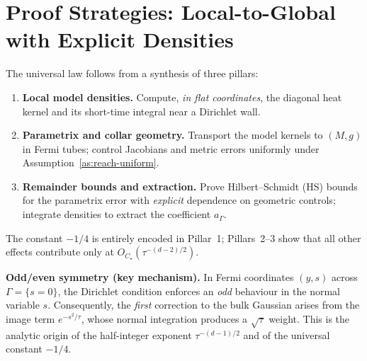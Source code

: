 
\section{Proof Strategies: Local-to-Global with Explicit Densities}
\label{sec:proof-strategy}

The universal law follows from a synthesis of three pillars:

\begin{enumerate}
  \item \textbf{Local model densities.} Compute, \emph{in flat coordinates}, the diagonal heat kernel and its short-time integral near a Dirichlet wall.
  \item \textbf{Parametrix and collar geometry.} Transport the model kernels to $(M,g)$ in Fermi tubes; control Jacobians and metric errors uniformly under Assumption~\ref{as:reach-uniform}.
  \item \textbf{Remainder bounds and extraction.} Prove Hilbert--Schmidt (HS) bounds for the parametrix error with \emph{explicit} dependence on geometric controls; integrate densities to extract the coefficient $a_\Gamma$.
\end{enumerate}

The constant $-1/4$ is entirely encoded in Pillar~1; Pillars~2–3 show that all other effects contribute only at $O_{C_\star}(\tau^{-(d-2)/2})$.

\medskip
\noindent\textbf{Odd/even symmetry (key mechanism).} In Fermi coordinates $(y,s)$ across $\Gamma=\{s=0\}$, the Dirichlet condition enforces an \emph{odd} behaviour in the normal variable $s$. Consequently, the \emph{first} correction to the bulk Gaussian arises from the image term $e^{-s^2/\tau}$, whose normal integration produces a $\sqrt{\tau}$ weight. This is the analytic origin of the half-integer exponent $\tau^{-(d-1)/2}$ and of the universal constant $-1/4$.

